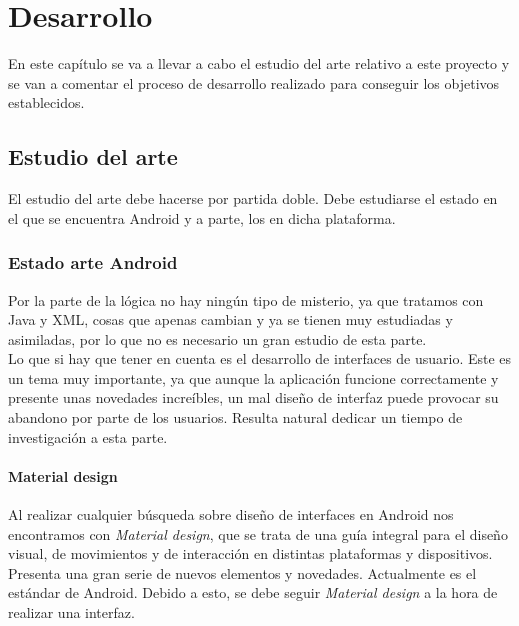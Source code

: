 \chapter{Desarrollo}
\label{cap:desarrollo}

En este capítulo se va a llevar a cabo el estudio del arte relativo a este proyecto y se van a comentar el proceso de desarrollo realizado para conseguir los objetivos establecidos.

\section{Estudio del arte}

El estudio del arte debe hacerse por partida doble. Debe estudiarse el estado en el que se encuentra Android y a parte, los  en dicha plataforma.\\

\subsection{Estado arte Android}

Por la parte de la lógica no hay ningún tipo de misterio, ya que tratamos con Java y XML, cosas que apenas cambian y ya se tienen muy estudiadas y asimiladas, por lo que no es necesario un gran estudio de esta parte.\\

Lo que si hay que tener en cuenta es el desarrollo de interfaces de usuario. Este es un tema muy importante, ya que aunque la aplicación funcione correctamente y presente unas novedades increíbles, un mal diseño de interfaz puede provocar su abandono por parte de los usuarios. Resulta natural dedicar un tiempo de investigación a esta parte.\\

\subsubsection{Material design}
Al realizar cualquier búsqueda sobre diseño de interfaces en Android nos encontramos con \textit{Material design}, que se trata de una guía integral para el diseño visual, de movimientos y de interacción en distintas plataformas y dispositivos. Presenta una gran serie de nuevos elementos y novedades. Actualmente es el estándar de Android. Debido a esto, se debe seguir \textit{Material design} a la hora de realizar una interfaz.

